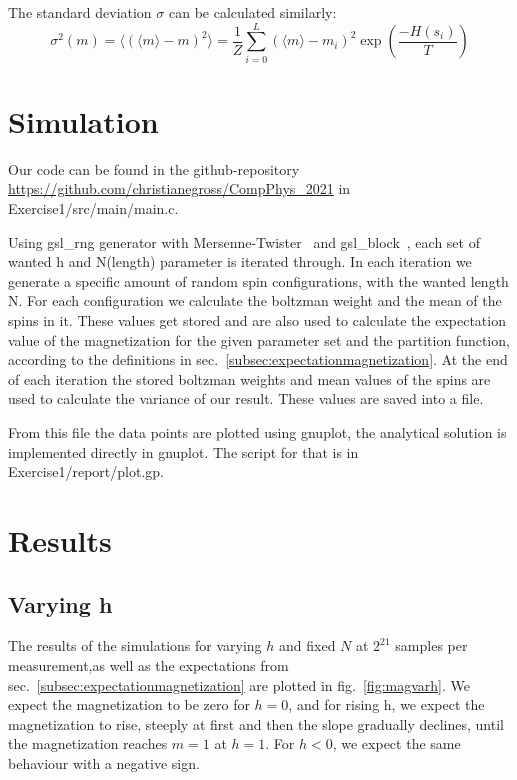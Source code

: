 \documentclass{scrartcl}
\begin{document}
The standard deviation $\sigma$ can be calculated similarly:
\[\sigma^2(m)=\langle(\langle m\rangle-m)^2\rangle=\frac{1}{Z}\sum_{i=0}^{L}(\langle m\rangle-m_i)^2\exp\left( \frac{-H(s_i)}{T}\right) \]



\section{Simulation}
Our code can be found in the github-repository \url{https://github.com/christianegross/CompPhys\_2021} in  Exercise1/src/main/main.c.


Using gsl\_rng generator with Mersenne-Twister~\cite{gsldoc} and gsl\_block~\cite{gsldoc_blk}, each set of wanted h and N(length) parameter is iterated through.
In each iteration we generate a specific amount of  random spin configurations, with the wanted length N.
For each configuration we calculate the boltzman weight and the mean of the spins in it. These values get stored and are also used to calculate the expectation value of the magnetization for the given parameter set and the partition function, according to the definitions in sec.~\ref{subsec:expectationmagnetization}. At the end of each iteration the stored boltzman weights and mean values of the spins are used to calculate the variance of our result. These values are saved into a file. 

From this file the data points are plotted using gnuplot, the analytical solution is implemented directly in gnuplot. The script for that is in Exercise1/report/plot.gp.

\section{Results}
\label{sec:results}
\subsection{Varying h}
The results of the simulations for varying $h$ and fixed $N$ at $2^{21}$ samples per measurement,as well as the expectations from sec.~\ref{subsec:expectationmagnetization} are plotted in fig.~\ref{fig:magvarh}. We expect the magnetization to be zero for $h=0$, and for rising h, we expect the magnetization to rise, steeply at first and then the slope gradually declines, until the magnetization reaches $m=1$ at $h=1$. For $h<0$, we expect the same behaviour with a negative sign. 
\end{document}
